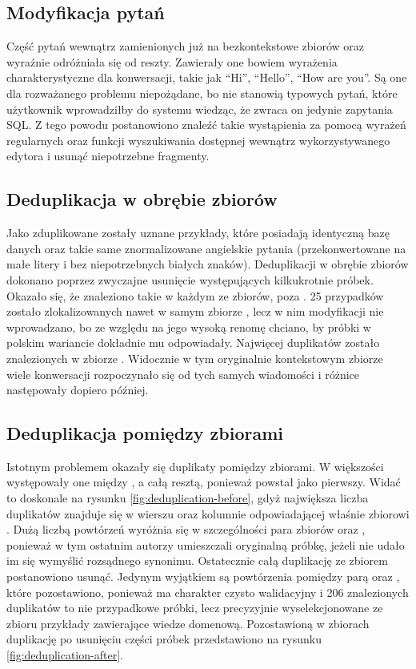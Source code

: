 \subsection{Modyfikacja pytań}
Część pytań wewnątrz zamienionych już na bezkontekstowe zbiorów  oraz  wyraźnie odróżniała się od reszty. Zawierały one bowiem wyrażenia charakterystyczne dla konwersacji, takie jak \enquote{Hi}, \enquote{Hello}, \enquote{How are you}. Są one dla rozważanego problemu niepożądane, bo nie stanowią typowych pytań, które użytkownik wprowadziłby do systemu wiedząc, że zwraca on jedynie zapytania SQL. Z tego powodu postanowiono znaleźć takie wystąpienia za pomocą wyrażeń regularnych oraz funkcji wyszukiwania dostępnej wewnątrz wykorzystywanego edytora i usunąć niepotrzebne fragmenty.

\subsection{Deduplikacja w obrębie zbiorów}
Jako zduplikowane zostały uznane przykłady, które posiadają identyczną bazę danych oraz takie same znormalizowane angielskie pytania (przekonwertowane na małe litery i bez niepotrzebnych białych znaków). Deduplikacji w obrębie zbiorów dokonano poprzez zwyczajne usunięcie występujących kilkukrotnie próbek. Okazało się, że znaleziono takie w każdym ze zbiorów, poza . 25 przypadków zostało zlokalizowanych nawet w samym zbiorze , lecz w nim modyfikacji nie wprowadzano, bo ze względu na jego wysoką renomę chciano, by próbki w polskim wariancie dokładnie mu odpowiadały. Najwięcej duplikatów zostało znalezionych w zbiorze . Widocznie w tym oryginalnie kontekstowym zbiorze wiele konwersacji rozpoczynało się od tych samych wiadomości i różnice następowały dopiero później.

\subsection{Deduplikacja pomiędzy zbiorami}
Istotnym problemem okazały się duplikaty pomiędzy zbiorami. W większości występowały one między , a całą resztą, ponieważ  powstał jako pierwszy. Widać to doskonale na rysunku \ref{fig:deduplication-before}, gdyż największa liczba duplikatów znajduje się w wierszu oraz kolumnie odpowiadającej właśnie zbiorowi . Dużą liczbą powtórzeń wyróżnia się w szczególności para zbiorów  oraz , ponieważ w tym ostatnim autorzy umieszczali oryginalną próbkę, jeżeli nie udało im się wymyślić rozsądnego synonimu. Ostatecznie całą duplikację ze zbiorem  postanowiono usunąć. Jedynym wyjątkiem są powtórzenia pomiędzy parą  oraz , które pozostawiono, ponieważ  ma charakter czysto walidacyjny i 206 znalezionych duplikatów to nie przypadkowe próbki, lecz precyzyjnie wyselekcjonowane ze zbioru  przykłady zawierające wiedze domenową. Pozostawioną w zbiorach duplikację po usunięciu części próbek przedstawiono na rysunku \ref{fig:deduplication-after}. 

